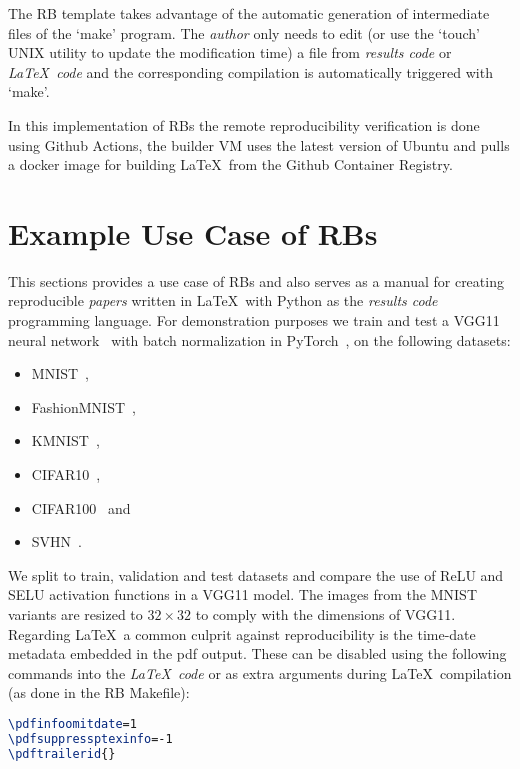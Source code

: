 \documentclass[journal]{IEEEtran}
\begin{document}
The RB template takes advantage of the automatic generation of intermediate files of the `make' program.
The \textit{author} only needs to edit (or use the `touch' UNIX utility to update the modification time) a file from \textit{results code} or \textit{\LaTeX\ code} and the corresponding compilation is automatically triggered with `make'.

In this implementation of RBs the remote reproducibility verification is done using Github Actions, the builder VM uses the latest version of Ubuntu and pulls a docker image for building \LaTeX\ from the Github Container Registry.

\section{Example Use Case of RBs}
This sections provides a use case of RBs and also serves as a manual for creating reproducible \textit{papers} written in \LaTeX\ with Python as the \textit{results code} programming language.
For demonstration purposes we train and test a VGG11 neural network~\cite{simonyan2014very} with batch normalization in PyTorch~\cite{paszke2019pytorch}, on the following datasets:
\begin{itemize}
	\item MNIST~\cite{lecun2010mnist},
	\item FashionMNIST~\cite{xiao2017fashion},
	\item KMNIST~\cite{clanuwat2018deep},
	\item CIFAR10~\cite{krizhevsky2009learning},
	\item CIFAR100~\cite{krizhevsky2009learning} and
	\item SVHN~\cite{netzer2011reading}.
\end{itemize}

We split to train, validation and test datasets and compare the use of ReLU and SELU activation functions in a VGG11 model.
The images from the MNIST variants are resized to $32\times 32$ to comply with the dimensions of VGG11.
Regarding \LaTeX\ a common culprit against reproducibility is the time-date metadata embedded in the pdf output.
These can be disabled using the following commands into the \textit{\LaTeX\ code} or as extra arguments during \LaTeX\ compilation (as done in the RB Makefile):
\begin{lstlisting}[language=TeX, style=lststyle, caption={\LaTeX\ pdf reproducibility commands.}, captionpos=b]
\pdfinfoomitdate=1
\pdfsuppressptexinfo=-1
\pdftrailerid{}
\end{lstlisting}
\end{document}
